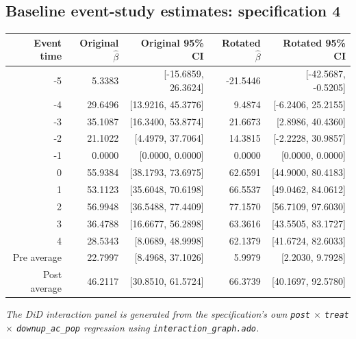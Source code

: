 \documentclass[10pt]{article}
\begin{document}
\subsection*{Baseline event-study estimates: specification 4}
\begin{center}
\scriptsize
\begin{tabular}{r rr rr}
\toprule
Event time & Original $\hat\beta$ & Original 95\% CI & Rotated $\hat\beta$ & Rotated 95\% CI \\
\midrule
-5 & 5.3383 & [-15.6859, 26.3624] & -21.5446 & [-42.5687, -0.5205] \\
-4 & 29.6496 & [13.9216, 45.3776] & 9.4874 & [-6.2406, 25.2155] \\
-3 & 35.1087 & [16.3400, 53.8774] & 21.6673 & [2.8986, 40.4360] \\
-2 & 21.1022 & [4.4979, 37.7064] & 14.3815 & [-2.2228, 30.9857] \\
-1 & 0.0000 & [0.0000, 0.0000] & 0.0000 & [0.0000, 0.0000] \\
0 & 55.9384 & [38.1793, 73.6975] & 62.6591 & [44.9000, 80.4183] \\
1 & 53.1123 & [35.6048, 70.6198] & 66.5537 & [49.0462, 84.0612] \\
2 & 56.9948 & [36.5488, 77.4409] & 77.1570 & [56.7109, 97.6030] \\
3 & 36.4788 & [16.6677, 56.2898] & 63.3616 & [43.5505, 83.1727] \\
4 & 28.5343 & [8.0689, 48.9998] & 62.1379 & [41.6724, 82.6033] \\
\midrule
Pre average & 22.7997 & [8.4968, 37.1026] & 5.9979 & [2.2030, 9.7928] \\
Post average & 46.2117 & [30.8510, 61.5724] & 66.3739 & [40.1697, 92.5780] \\
\bottomrule
\end{tabular}
\end{center}
\medskip
\textit{The DiD interaction panel is generated from the specification's own \texttt{post} $\times$ \texttt{treat} $\times$ \texttt{downup\_ac\_pop} regression using \texttt{interaction\_graph.ado}.}
\clearpage
\end{document}

